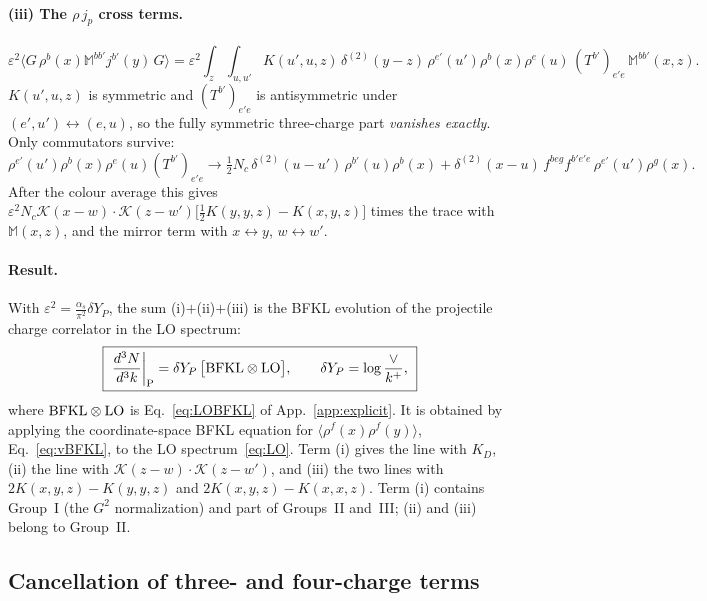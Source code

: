\documentclass[aps,prd,onecolumn,superscriptaddress,nofootinbib,floatfix,longbibliography,11pt]{revtex4-2}
\numberwithin{equation}{section}
\newcommand{\KK}{\mathcal{K}}
\begin{document}
\paragraph*{(iii) The $\rho\,j_p$ cross terms.}
\begin{equation}
\varepsilon^2\langle G\,\rho^b(x)\mathbb M^{bb'}j^{b'}(y)\,G\rangle=\varepsilon^2\int_z\int_{u,u'}K(u',u,z)\,\delta^{(2)}(y-z)\,\rho^{e'}(u')\rho^b(x)\rho^e(u)\,(T^{b'})_{e'e}\,\mathbb M^{bb'}(x,z).
\end{equation}
$K(u',u,z)$ is symmetric and $(T^{b'})_{e'e}$ is antisymmetric under $(e',u')\leftrightarrow(e,u)$, so the fully symmetric three-charge part \emph{vanishes exactly}. Only commutators survive:
\begin{equation}
\rho^{e'}(u')\rho^b(x)\rho^e(u)(T^{b'})_{e'e}\to\tfrac12N_c\,\delta^{(2)}(u-u')\,\rho^{b'}(u)\rho^b(x)+\delta^{(2)}(x-u)\,f^{beg}f^{b'e'e}\,\rho^{e'}(u')\rho^g(x).
\end{equation}
After the colour average this gives $\varepsilon^2N_c\KK(x-w)\cdot\KK(z-w')\big[\frac12K(y,y,z)-K(x,y,z)\big]$ times the trace with $\mathbb M(x,z)$, and the mirror term with $x\leftrightarrow y$, $w\leftrightarrow w'$.

\paragraph*{Result.} With $\varepsilon^2=\frac{\alpha_s}{\pi^2}\delta Y_P$, the sum (i)$+$(ii)$+$(iii) is the BFKL evolution of the projectile charge correlator in the LO spectrum:
\begin{equation}
\boxed{\ \frac{d^3N}{d^3k}\bigg|_{\rm P}=\delta Y_P\,\big[{\rm BFKL}\otimes{\rm LO}\big],\qquad \delta Y_P=\log\frac{\vee}{k^+},\ }
\label{eq:Presult}
\end{equation}
where ${\rm BFKL}\otimes{\rm LO}$ is Eq.~\eqref{eq:LOBFKL} of App.~\ref{app:explicit}. It is obtained by applying the coordinate-space BFKL equation for $\langle\rho^f(x)\rho^f(y)\rangle$, Eq.~\eqref{eq:vBFKL}, to the LO spectrum~\eqref{eq:LO}. Term (i) gives the line with $K_D$, (ii) the line with $\KK(z-w)\cdot\KK(z-w')$, and (iii) the two lines with $2K(x,y,z)-K(y,y,z)$ and $2K(x,y,z)-K(x,x,z)$. Term (i) contains Group~I (the $G^2$ normalization) and part of Groups~II and~III; (ii) and (iii) belong to Group~II.

\subsection{Cancellation of three- and four-charge terms}\label{sec:cancel}
\end{document}
